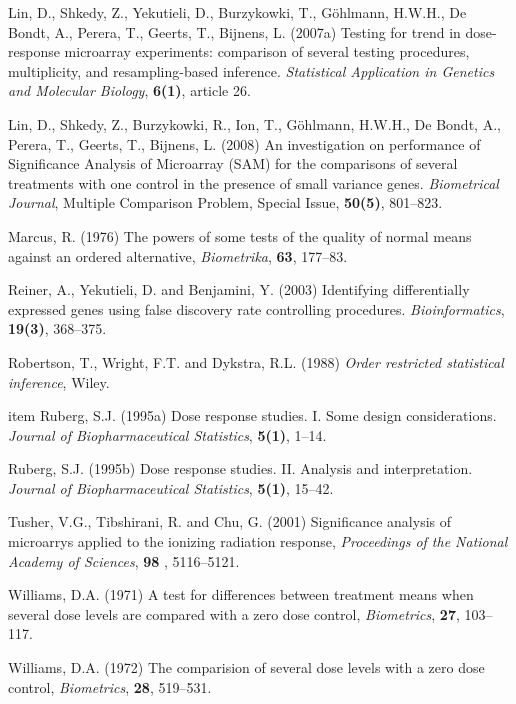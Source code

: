 \documentclass[10pt]{mybook4}
\begin{document}
\begin{list}{}{\setlength{\leftmargin}{.3in}\setlength{\itemindent}{-.2in}}
\item Lin, D., Shkedy, Z., Yekutieli, D., Burzykowki,
T., G\"{o}hlmann, H.W.H., De Bondt, A., Perera, T., Geerts, T.,
Bijnens, L. (2007a) Testing for trend in dose-response microarray
experiments: comparison of several testing procedures, multiplicity,
and resampling-based inference. \textit{Statistical Application in
Genetics and Molecular Biology}, \textbf{6(1)}, article 26.%

\item Lin, D., Shkedy, Z., Burzykowki, R., Ion,
T., G\"{o}hlmann, H.W.H., De Bondt, A., Perera, T., Geerts, T.,
Bijnens, L. (2008) An investigation on performance of Significance
Analysis of Microarray (SAM) for the comparisons of several
treatments with one control in the presence of small variance genes.
\textit{Biometrical Journal}, Multiple Comparison Problem, Special Issue,
\textbf{50(5)}, 801--823.%



\item Marcus, R. (1976) The powers of some tests of
the quality of normal means against an ordered alternative,
\textit{Biometrika}, \textbf{63}, 177--83.%

\item Reiner, A., Yekutieli, D. and
Benjamini, Y. (2003) Identifying differentially expressed genes
using false discovery rate controlling procedures.
\textit{Bioinformatics}, \textbf{19(3)}, 368--375.%

\item Robertson, T., Wright, F.T. and Dykstra, R.L. (1988) \textit{ Order restricted statistical inference}, Wiley.%



item Ruberg, S.J. (1995a) Dose response studies. I. Some design
considerations. \textit{Journal of Biopharmaceutical Statistics},
\textbf{5(1)}, 1--14.%

\item Ruberg, S.J. (1995b) Dose response studies. II. Analysis and
interpretation. \textit{Journal of Biopharmaceutical Statistics},
\textbf{5(1)}, 15--42.%

\item Tusher, V.G., Tibshirani, R. and
Chu, G. (2001) Significance analysis of microarrys applied to the
ionizing radiation response, \textit{Proceedings of the National
Academy of Sciences}, \textbf{98} , 5116--5121.%


\item Williams, D.A. (1971) A test for differences between treatment
means when several dose levels are compared with a zero dose
control, \textit{Biometrics}, \textbf{27}, 103--117.%

\item Williams, D.A. (1972) The comparision of several dose levels
with a zero dose control, \textit{Biometrics}, \textbf{28},
519--531.%


\end{list}
\end{document}
